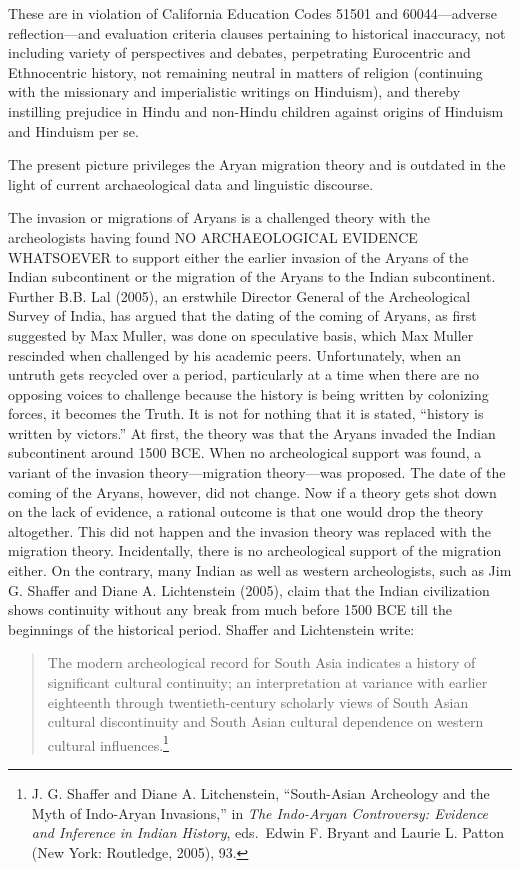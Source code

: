 These are in violation of California Education Codes 51501 and 60044—adverse reflection—and evaluation criteria clauses pertaining to historical inaccuracy, not including variety of perspectives and debates, perpetrating Eurocentric and Ethnocentric history, not remaining neutral in matters of religion (continuing with the missionary and imperialistic writings on Hinduism), and thereby instilling prejudice in Hindu and non-Hindu children against origins of Hinduism and Hinduism per se. 
\vskip 2pt

The present picture privileges the Aryan migration theory and is outdated in the light of current archaeological data and linguistic discourse. 
\vskip 2pt

The invasion or migrations of Aryans is a challenged theory with the archeologists having found NO ARCHAEOLOGICAL EVIDENCE WHATSOEVER to support either the earlier invasion of the Aryans of the Indian subcontinent or the migration of the Aryans to the Indian subcontinent. Further B.B. Lal (2005), an erstwhile Director General of the Archeological Survey of India, has argued that the dating of the coming of Aryans, as first suggested by Max Muller, was done on speculative basis, which Max Muller rescinded when challenged by his academic peers. Unfortunately, when an untruth gets recycled over a period, particularly at a time when there are no opposing voices to challenge because the history is being written by colonizing forces, it becomes the Truth. It is not for nothing that it is stated, “history is written by victors.” At first, the theory was that the Aryans invaded the Indian subcontinent around 1500 BCE. When no archeological support was found, a variant of the invasion theory—migration theory—was proposed. The date of the coming of the Aryans, however, did not change. Now if a theory gets shot down on the lack of evidence, a rational outcome is that one would drop the theory altogether. This did not happen and the invasion theory was replaced with the migration theory. Incidentally, there is no archeological support of the migration either. On the contrary, many Indian as well as western archeologists, such as Jim G. Shaffer and Diane A. Lichtenstein (2005), claim that the Indian civilization shows continuity without any break from much before 1500 BCE till the beginnings of the historical period. Shaffer and Lichtenstein write:

\begin{quote}
The modern archeological record for South Asia indicates a history of significant cultural continuity; an interpretation at variance with earlier eighteenth through twentieth-century scholarly views of South Asian cultural discontinuity and South Asian cultural dependence on western cultural influences.\footnote{J. G. Shaffer and Diane A. Litchenstein, “South-Asian Archeology and 	the Myth of Indo-Aryan Invasions,” in \textit{The 	Indo-Aryan Controversy: Evidence and Inference in Indian History}, eds.\ Edwin F. Bryant and Laurie L. Patton (New York: Routledge, 2005), 	93.}
\end{quote}

